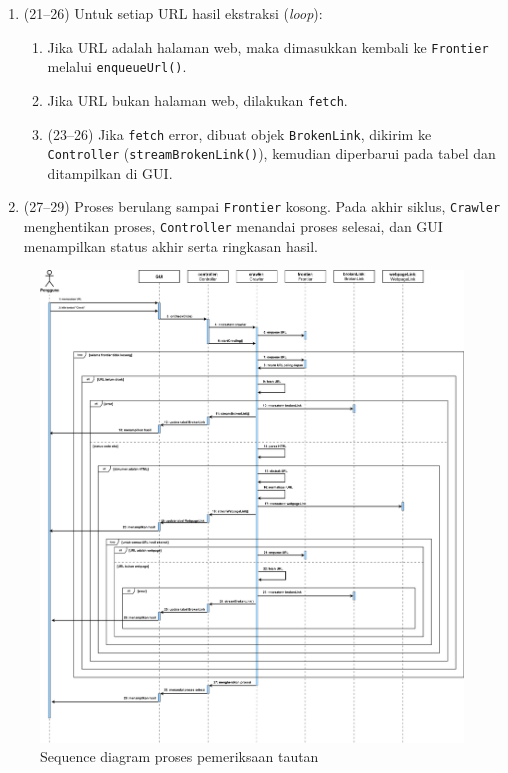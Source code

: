 \begin{enumerate}
    \item (21–26) Untuk setiap URL hasil ekstraksi (\textit{loop}):  
    \begin{enumerate}
        \item Jika URL adalah halaman web, maka dimasukkan kembali ke \texttt{Frontier} melalui \texttt{enqueueUrl()}.  
        \item Jika URL bukan halaman web, dilakukan \texttt{fetch}.  
        \item (23–26) Jika \texttt{fetch} error, dibuat objek \texttt{BrokenLink}, dikirim ke \texttt{Controller} (\texttt{streamBrokenLink()}), kemudian diperbarui pada tabel dan ditampilkan di GUI.  
    \end{enumerate}
    \item (27–29) Proses berulang sampai \texttt{Frontier} kosong. Pada akhir siklus, \texttt{Crawler} menghentikan proses, \texttt{Controller} menandai proses selesai, dan GUI menampilkan status akhir serta ringkasan hasil.  
\end{enumerate}

\begin{figure}[H]
    \centering
    \includegraphics[width=1\textwidth]{Gambar/040200-sequence-diagram.png}
    \caption{Sequence diagram proses pemeriksaan tautan}
    \label{fig:sequence-crawl}
\end{figure}